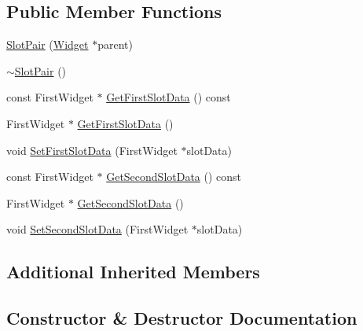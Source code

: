 \subsection*{Public Member Functions}
\begin{DoxyCompactItemize}
\item 
\mbox{\hyperlink{classec__gui_1_1_slot_pair_a2f36af31276d14b36f0d36b0f43bce16}{Slot\+Pair}} (\mbox{\hyperlink{classec__gui_1_1_widget}{Widget}} $\ast$parent)
\item 
\mbox{\hyperlink{classec__gui_1_1_slot_pair_ac70eedc0a4e7c5ef1353746ae33c50d5}{$\sim$\+Slot\+Pair}} ()
\item 
const First\+Widget $\ast$ \mbox{\hyperlink{classec__gui_1_1_slot_pair_a0b94f3971d74877a6b72094151a427db}{Get\+First\+Slot\+Data}} () const
\item 
First\+Widget $\ast$ \mbox{\hyperlink{classec__gui_1_1_slot_pair_a41128f9c6e03199fcd5b6d6bb62e6fbd}{Get\+First\+Slot\+Data}} ()
\item 
void \mbox{\hyperlink{classec__gui_1_1_slot_pair_a54aada2b93464cddf14fb48f26d02758}{Set\+First\+Slot\+Data}} (First\+Widget $\ast$slot\+Data)
\item 
const First\+Widget $\ast$ \mbox{\hyperlink{classec__gui_1_1_slot_pair_ad526585768d89b321b653a5f1c960519}{Get\+Second\+Slot\+Data}} () const
\item 
First\+Widget $\ast$ \mbox{\hyperlink{classec__gui_1_1_slot_pair_a70010591bb529af0204d786df67e8e37}{Get\+Second\+Slot\+Data}} ()
\item 
void \mbox{\hyperlink{classec__gui_1_1_slot_pair_a1114951b564814e1794ed938f46c463c}{Set\+Second\+Slot\+Data}} (First\+Widget $\ast$slot\+Data)
\end{DoxyCompactItemize}
\subsection*{Additional Inherited Members}


\subsection{Constructor \& Destructor Documentation}
\mbox{\label{classec__gui_1_1_slot_pair_a2f36af31276d14b36f0d36b0f43bce16}} 
